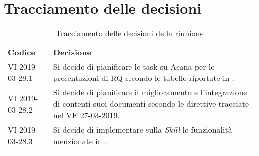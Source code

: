 \clearpage
\section{Tracciamento delle decisioni}
\begin{center}
	\renewcommand{\arraystretch}{1.5}
	\begin{longtable}{  p{2.8cm} p{11.4cm} }
		\rowcolor{tableHeadYellow}
		\textbf{Codice}&\textbf{Decisione}\\
		VI 2019-03-28.1 & Si decide di pianificare le task su Asana per le presentazioni di RQ secondo le tabelle riportate in \addref{sec:organizzazione} .\\
		VI 2019-03-28.2 & Si decide di pianificare il miglioramento e l'integrazione di contenti suoi documenti secondo le direttive tracciate nel VE 27-03-2019.\\
		VI 2019-03-28.3 & Si decide di implementare sulla \textit{Skill} le funzionalità menzionate in \addref{sec:funzionalità}.\\
		\rowcolor{white}
		\caption{Tracciamento delle decisioni della riunione}
	\end{longtable}	
\end{center}